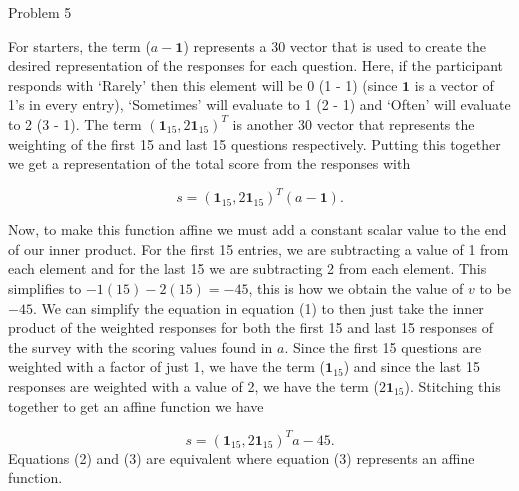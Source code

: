 \begin{problem}{Problem 5}
\begin{highlight}[Solution]
        For starters, the term ($a-\mathbf{1}$) represents a 30 vector that is used to create the desired representation of the responses for each question. Here, if the participant responds with `Rarely' 
        then this element will be 0 (1 - 1) (since $\mathbf{1}$ is a vector of 1's in every entry), `Sometimes' will evaluate to 1 (2 - 1) and `Often' will evaluate to 2 (3 - 1). The term $(\mathbf{1}_{15},2\mathbf{1}_{15})^{T}$
        is another 30 vector that represents the weighting of the first 15 and last 15 questions respectively. Putting this together we get a representation of the total score from the responses with

        \begin{equation}
            s = (\mathbf{1}_{15},2\mathbf{1}_{15})^{T}(a-\mathbf{1}).
        \end{equation}
        
        Now, to make this function affine we must add a constant scalar value to the end of our inner product. For the first 15 entries, we are subtracting a value of 1 from each element and for the last 
        15 we are subtracting 2 from each element. This simplifies to $-1(15) - 2(15) = -45$, this is how we obtain the value of $v$ to be $-45$. We can simplify the equation in equation (1) to then just 
        take the inner product of the weighted responses for both the first 15 and last 15 responses of the survey with the scoring values found in $a$. Since the first 15 questions are weighted with a factor
        of just 1, we have the term ($\mathbf{1}_{15}$) and since the last 15 responses are weighted with a value of 2, we have the term ($2\mathbf{1}_{15}$). Stitching this together to get an affine function
        we have

        \begin{equation}
            s = (\mathbf{1}_{15},2\mathbf{1}_{15})^{T}a - 45.
        \end{equation}
        Equations (2) and (3) are equivalent where equation (3) represents an affine function.
    \end{highlight}
\end{problem}

